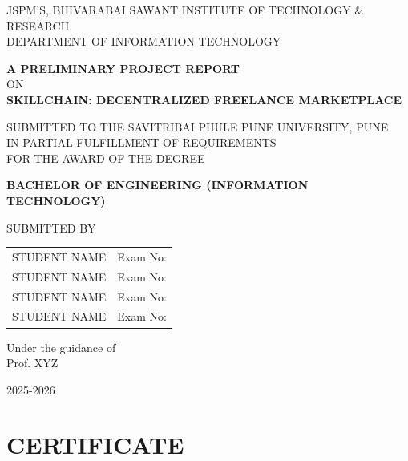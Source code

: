 \documentclass[12pt,a4paper]{report}
\begin{document}
\begin{titlepage}
\centering

{\large JSPM'S, BHIVARABAI SAWANT INSTITUTE OF TECHNOLOGY \& RESEARCH}\\
{\large DEPARTMENT OF INFORMATION TECHNOLOGY}

\vspace{2cm}

{\Large \textbf{A PRELIMINARY PROJECT REPORT}}\\[0.5cm]
{\large ON}\\[0.5cm]

{\Large \textbf{SKILLCHAIN: DECENTRALIZED FREELANCE MARKETPLACE}}

\vspace{2cm}

SUBMITTED TO THE SAVITRIBAI PHULE PUNE UNIVERSITY, PUNE\\
IN PARTIAL FULFILLMENT OF REQUIREMENTS\\
FOR THE AWARD OF THE DEGREE\\

\vspace{1cm}

\textbf{BACHELOR OF ENGINEERING (INFORMATION TECHNOLOGY)}

\vspace{1.5cm}

SUBMITTED BY

\vspace{1cm}

\begin{tabular}{ll}
STUDENT NAME & Exam No: \\
STUDENT NAME & Exam No: \\
STUDENT NAME & Exam No: \\
STUDENT NAME & Exam No: \\
\end{tabular}

\vspace{1.5cm}

Under the guidance of\\
Prof. XYZ

\vfill

2025-2026

\end{titlepage}

\chapter*{CERTIFICATE}
\end{document}
